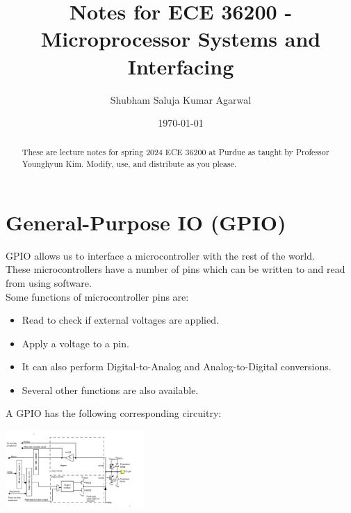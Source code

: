 \documentclass[nobib]{tufte-handout}
\title{Notes for ECE 36200 - Microprocessor Systems and Interfacing}
\author[Shubham Saluja Kumar Agarwal]{Shubham Saluja Kumar Agarwal}
\date{\today}  %
\begin{document}
\maketitle

\begin{abstract}
    These are lecture notes for spring 2024 ECE 36200 at Purdue as taught by Professor Younghyun Kim. Modify, use, and distribute as you please.
\end{abstract}

\tableofcontents

\newpage

\section{General-Purpose IO (GPIO)}
GPIO allows us to interface a microcontroller with the rest of the world.\\
These microcontrollers have a number of pins which can be written to and read from using software.\\
Some functions of microcontroller pins are:
\begin{itemize}
    \item Read to check if external voltages are applied.
    \item Apply a voltage to a pin.
    \item It can also perform Digital-to-Analog and Analog-to-Digital conversions.
    \item Several other functions are also available.
\end{itemize}
A GPIO has the following corresponding circuitry:
\begin{center}
    \includegraphics[width = 200px]{images/gpio_circuitry.png}
\end{center}
\end{document}
